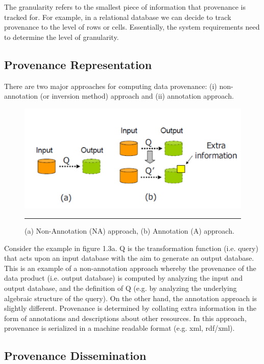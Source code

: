 The granularity refers to the smallest piece of information that provenance is tracked for. For example, in a relational database we can decide to track provenance to the level of rows or cells. Essentially, the system requirements need to determine the level of granularity.


\subsection{Provenance Representation}
There are two major approaches for computing data provenance\cite{reference5}: (i) non-annotation (or inversion method) approach and (ii) annotation approach.

\begin{figure}[htbp]
	\centering
		\includegraphics[scale=0.5]{./Figures/chapter2/figure3.pdf}
		\rule{35em}{0.5pt}
	\caption[Provenance Represantation]{(a) Non-Annotation (NA) approach, (b) Annotation (A) approach\cite{reference5}.}
	\label{fig:provRepresentation}
\end{figure}

Consider the example in figure 1.3a.  Q is the transformation function (i.e. query) that acts upon an input database with the aim to generate an output database. This is an example of a non-annotation approach whereby the provenance of the data product (i.e. output database) is computed by analyzing the input and output database, and the definition of Q (e.g. by analyzing the underlying algebraic structure of the query\cite{reference6:18}). On the other hand, the annotation approach is slightly different. Provenance is determined by collating extra information in the form of annotations and descriptions about other resources. In this approach, provenance is serialized in a machine readable format (e.g. xml, rdf/xml).



\subsection{Provenance Dissemination}

